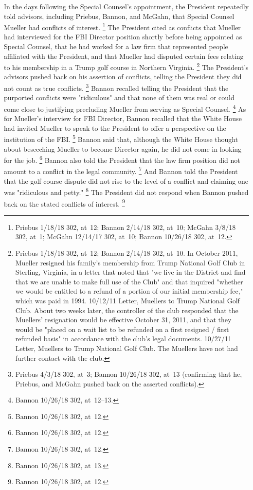 {In the days following the Special Counsel's appointment, the President repeatedly told advisors, including Priebus, Bannon, and McGahn, that Special Counsel Mueller had conflicts of interest.%
\footnote{Priebus 1/18/18 302, at~12;
Bannon 2/14/18 302, at~10;
McGahn 3/8/18 302, at~1;
McGahn 12/14/17 302, at~10;
Bannon 10/26/18 302, at~12.}
The President cited as conflicts that Mueller had interviewed for the FBI Director position shortly before being appointed as Special Counsel, that he had worked for a law firm that represented people affiliated with the President, and that Mueller had disputed certain fees relating to his membership in a Trump golf course in Northern Virginia.%
\footnote{Priebus 1/18/18 302, at~12;
Bannon 2/14/18 302, at~10.
In October 2011, Mueller resigned his family's membership from Trump National Golf Club in Sterling, Virginia, in a letter that noted that "we live in the District and find that we are unable to make full use of the Club" and that inquired "whether we would be entitled to a refund of a portion of our initial membership fee," which was paid in 1994.
10/12/11 Letter, Muellers to Trump National Golf Club.
About two weeks later, the controller of the club responded that the Muellers' resignation would be effective October 31, 2011, and that they would be "placed on a wait list to be refunded on a first resigned / first refunded basis" in accordance with the club's legal documents.
10/27/11 Letter, Muellers to Trump National Golf Club.
The Muellers have not had further contact with the club.}
The President's advisors pushed back on his assertion of conflicts, telling the President they did not count as true conflicts.%
\footnote{Priebus 4/3/18 302, at~3;
Bannon 10/26/18 302, at~13 (confirming that he, Priebus, and McGahn pushed back on the asserted conflicts).}
Bannon recalled telling the President that the purported conflicts were "ridiculous" and that none of them was real or could come close to justifying precluding Mueller from serving as Special Counsel.%
\footnote{Bannon 10/26/18 302, at~12--13.}
As for Mueller's interview for FBI Director, Bannon recalled that the White House had invited Mueller to speak to the President to offer a perspective on the institution of the FBI\null.%
\footnote{Bannon 10/26/18 302, at~12.}
Bannon said that, although the White House thought about beseeching Mueller to become Director again, he did not come in looking for the job.%
\footnote{Bannon 10/26/18 302, at~12.}
Bannon also told the President that the law firm position did not amount to a conflict in the legal community.%
\footnote{Bannon 10/26/18 302, at~12.}
And Bannon told the President that the golf course dispute did not rise to the level of a conflict and claiming one was "ridiculous and petty."%
\footnote{Bannon 10/26/18 302, at~13.}
The President did not respond when Bannon pushed back on the stated conflicts of interest.%
\footnote{Bannon 10/26/18 302, at~12.}

}
